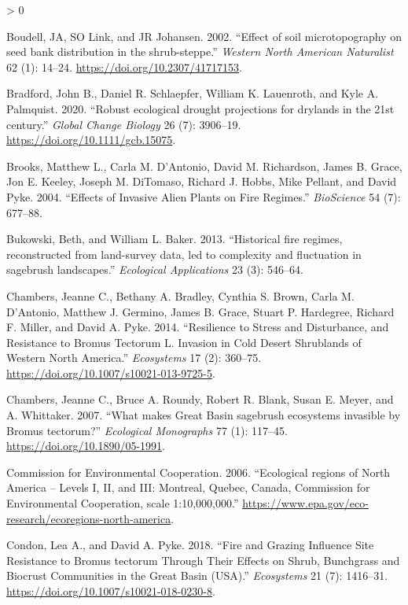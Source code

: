 \documentclass[
  12pt,
]{article}
\newlength{\cslhangindent}
\newenvironment{CSLReferences}[2] %
 {%
  \setlength{\parindent}{0pt}
  \ifodd #1 \everypar{\setlength{\hangindent}{\cslhangindent}}\ignorespaces\fi
  \ifnum #2 > 0
  \setlength{\parskip}{#2\baselineskip}
  \fi
 }%
 {}
\begin{document}
\begin{CSLReferences}{1}{0}
\leavevmode\hypertarget{ref-Boudell2002}{}%
Boudell, JA, SO Link, and JR Johansen. 2002. {``{Effect of soil
microtopography on seed bank distribution in the shrub-steppe}.''}
\emph{Western North American Naturalist} 62 (1): 14--24.
\url{https://doi.org/10.2307/41717153}.

\leavevmode\hypertarget{ref-Bradford2020}{}%
Bradford, John B., Daniel R. Schlaepfer, William K. Lauenroth, and Kyle
A. Palmquist. 2020. {``{Robust ecological drought projections for
drylands in the 21st century}.''} \emph{Global Change Biology} 26 (7):
3906--19. \url{https://doi.org/10.1111/gcb.15075}.

\leavevmode\hypertarget{ref-Brooks2004}{}%
Brooks, Matthew L., Carla M. D'Antonio, David M. Richardson, James B.
Grace, Jon E. Keeley, Joseph M. DiTomaso, Richard J. Hobbs, Mike
Pellant, and David Pyke. 2004. {``{Effects of Invasive Alien Plants on
Fire Regimes}.''} \emph{BioScience} 54 (7): 677--88.

\leavevmode\hypertarget{ref-Bukowski2013}{}%
Bukowski, Beth, and William L. Baker. 2013. {``{Historical fire regimes,
reconstructed from land-survey data, led to complexity and fluctuation
in sagebrush landscapes}.''} \emph{Ecological Applications} 23 (3):
546--64.

\leavevmode\hypertarget{ref-chambers_resilience_2014}{}%
Chambers, Jeanne C., Bethany A. Bradley, Cynthia S. Brown, Carla M.
D'Antonio, Matthew J. Germino, James B. Grace, Stuart P. Hardegree,
Richard F. Miller, and David A. Pyke. 2014. {``Resilience to Stress and
Disturbance, and Resistance to {Bromus} Tectorum {L}. Invasion in Cold
Desert Shrublands of Western {North} {America}.''} \emph{Ecosystems} 17
(2): 360--75. \url{https://doi.org/10.1007/s10021-013-9725-5}.

\leavevmode\hypertarget{ref-Chambers2007}{}%
Chambers, Jeanne C., Bruce A. Roundy, Robert R. Blank, Susan E. Meyer,
and A. Whittaker. 2007. {``{What makes Great Basin sagebrush ecosystems
invasible by Bromus tectorum?}''} \emph{Ecological Monographs} 77 (1):
117--45. \url{https://doi.org/10.1890/05-1991}.

\leavevmode\hypertarget{ref-CEC2006}{}%
Commission for Environmental Cooperation. 2006. {``{Ecological regions
of North America -- Levels I, II, and III: Montreal, Quebec, Canada,
Commission for Environmental Cooperation, scale 1:10,000,000}.''}
\url{https://www.epa.gov/eco-research/ecoregions-north-america}.

\leavevmode\hypertarget{ref-Condon2018}{}%
Condon, Lea A., and David A. Pyke. 2018. {``{Fire and Grazing Influence
Site Resistance to Bromus tectorum Through Their Effects on Shrub,
Bunchgrass and Biocrust Communities in the Great Basin (USA)}.''}
\emph{Ecosystems} 21 (7): 1416--31.
\url{https://doi.org/10.1007/s10021-018-0230-8}.


\end{CSLReferences}
\end{document}
